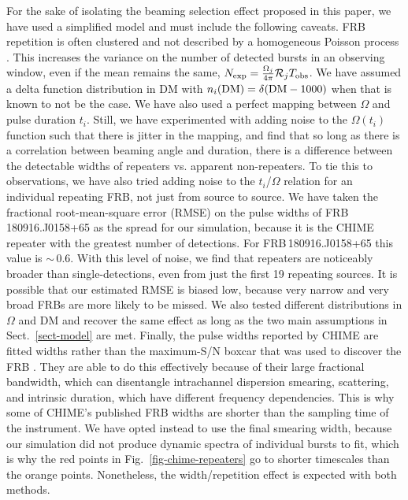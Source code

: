 \documentclass[fleqn,usenatbib]{mnras}
\begin{document}
For the sake of isolating the beaming selection effect proposed in this paper,
we have used a simplified model and must include the following caveats. 
FRB repetition is often clustered and not described by a homogeneous Poisson 
process \citep{scholz-2016, oppermann-2018, gourdji2019}. This increases the 
variance on the number of detected bursts in an observing window, 
even if the mean remains the same, $N_{\rm exp} = \frac{\Omega_j}{4\pi} \mathcal{R}_j T_{\rm obs}$. We have assumed a delta function 
distribution in DM with $n_i(\rm DM) = \delta\!\left (\mathrm{DM} - 1000 \right )$ when 
that is known to not be the case. We have also used a perfect mapping between $\Omega$ and pulse 
duration $t_i$. Still, we have experimented with adding noise 
to the $\Omega(t_i)$ function such that there is jitter in the mapping, 
and find that so long as there is a correlation between beaming angle 
and duration, there is a difference between the detectable 
widths of repeaters vs. apparent non-repeaters. 
To tie this to observations, we have also tried adding noise to the 
$t_i$/$\Omega$ relation for an individual repeating FRB, not just 
from source to source. We 
have taken the fractional root-mean-square error (RMSE) on the pulse widths of  
FRB\,180916.J0158+65 as the spread 
for our simulation, because it is the CHIME repeater with the 
greatest number of detections. 
For FRB\,180916.J0158+65 this value is 
$\sim$\,0.6. With this level of noise, we find that repeaters
are noticeably broader than single-detections, even from just the 
first 19 repeating sources. It is possible that our estimated 
RMSE is biased low, because very narrow and very broad FRBs are 
more likely to be missed.
We also tested different 
distributions in $\Omega$ and DM and recover the same effect as long as 
the two main assumptions in Sect.~\ref{sect-model} are met. Finally, 
the pulse widths reported by CHIME are fitted widths rather than the 
maximum-S/N boxcar that was used to discover the FRB \citep{chime2019a, chime19-8repeaters, fonseca-2020-apj}. They are able to 
do this effectively because of their large fractional bandwidth, which can 
disentangle intrachannel dispersion smearing, scattering, 
and intrinsic duration, which have different frequency dependencies.
This is why some of CHIME's published FRB widths are shorter 
than the sampling time of the 
instrument. We have opted instead to use the final smearing width, because 
our simulation did not produce dynamic spectra of individual bursts 
to fit, which is why the red points in Fig.~\ref{fig-chime-repeaters} 
go to shorter timescales than the orange points. Nonetheless, the width/repetition effect is expected with 
both methods.
\end{document}
